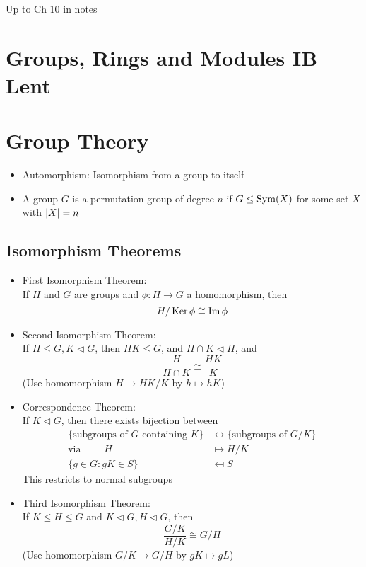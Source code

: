 



Up to Ch 10 in notes

\section*{Groups, Rings and Modules \hfill IB Lent}

\section{Group Theory}

\begin{itemize}
      \item Automorphism: Isomorphism from a group to itself
      \item A group $G$ is a permutation group of degree $n$ if $G \leq \operatorname{Sym}(X)$ for some set $X$ with $\left| X \right| = n$
\end{itemize}


\subsection*{Isomorphism Theorems}
\begin{itemize}
      \item First Isomorphism Theorem: \\ If $H$ and $G$ are groups and $\phi: H \to G$ a homomorphism, then \[H/ \operatorname{Ker} \phi \cong \operatorname{Im} \phi\]
      \item Second Isomorphism Theorem: \\ If $H \leq G, K \triangleleft G$, then $HK \leq G$, and $H \cap K \triangleleft H$, and  \[ \frac{H}{H \cap K} \cong \frac{HK}{K}\]
            (Use homomorphism $H \to HK/K$ by $h \mapsto hK$)
      \item Correspondence Theorem: \\
            If $K \triangleleft G$, then there exists bijection between
            \begin{align*}
                  \{\text{subgroups of } G \text{ containing } K \} & \leftrightarrow \{\text{subgroups of } G/K \} \\
                  \text{via } \qquad  H                             & \mapsto H/K                                   \\
                  \{g \in G : gK \in S\}                            & \mapsfrom S
            \end{align*}
            This restricts to normal subgroups

      \item Third Isomorphism Theorem: \\
            If $K \leq H \leq G$ and $K \triangleleft G, H \triangleleft G$, then \[\frac{G/K}{H/K} \cong G/H \]
            (Use homomorphism $G/K \to G/H$ by $gK \mapsto gL$)
\end{itemize}

